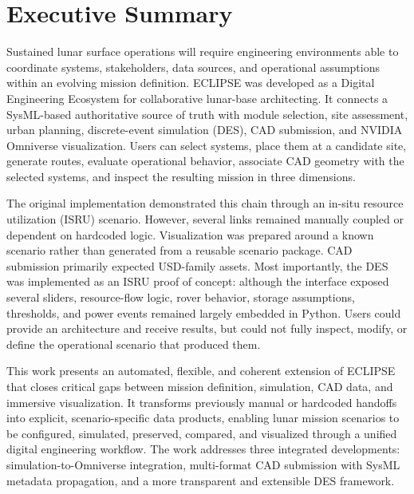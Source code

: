 
\section*{Executive Summary}

Sustained lunar surface operations will require engineering environments able to coordinate systems, stakeholders, data sources, and operational assumptions within an evolving mission definition. ECLIPSE was developed as a Digital Engineering Ecosystem for collaborative lunar-base architecting. It connects a SysML-based authoritative source of truth with module selection, site assessment, urban planning, discrete-event simulation (DES), CAD submission, and NVIDIA Omniverse visualization. Users can select systems, place them at a candidate site, generate routes, evaluate operational behavior, associate CAD geometry with the selected systems, and inspect the resulting mission in three dimensions.

The original implementation demonstrated this chain through an in-situ resource utilization (ISRU) scenario. However, several links remained manually coupled or dependent on hardcoded logic. Visualization was prepared around a known scenario rather than generated from a reusable scenario package. CAD submission primarily expected USD-family assets. Most importantly, the DES was implemented as an ISRU proof of concept: although the interface exposed several sliders, resource-flow logic, rover behavior, storage assumptions, thresholds, and power events remained largely embedded in Python. Users could provide an architecture and receive results, but could not fully inspect, modify, or define the operational scenario that produced them.

This work presents an automated, flexible, and coherent extension of ECLIPSE that closes critical gaps between mission definition, simulation, CAD data, and immersive visualization. It transforms previously manual or hardcoded handoffs into explicit, scenario-specific data products, enabling lunar mission scenarios to be configured, simulated, preserved, compared, and visualized through a unified digital engineering workflow. The work addresses three integrated developments: simulation-to-Omniverse integration, multi-format CAD submission with SysML metadata propagation, and a more transparent and extensible DES framework.

